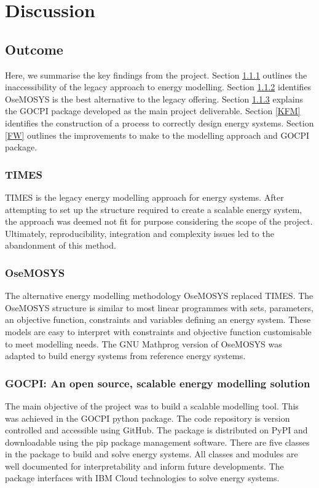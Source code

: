 \documentclass[12pt]{article}
\begin{document}
\section{Discussion}
\subsection{Outcome}
Here, we summarise the key findings from the project. 
Section \ref{KFT} outlines the inaccessibility of the legacy approach to energy modelling.
Section \ref{KFO} identifies OseMOSYS is the best alternative to the legacy offering.
Section \ref{KFG} explains the GOCPI package developed as the main project deliverable.
Section \ref{KFM} identifies the construction of a process to correctly design energy systems.
Section \ref{FW} outlines the improvements to make to the modelling approach and GOCPI package.
\subsubsection{TIMES} \label{KFT}
TIMES is the legacy energy modelling approach for energy systems. 
After attempting to set up the structure required to create a scalable energy system, the approach was deemed not fit for purpose considering the scope of the project.
Ultimately, reproducibility, integration and complexity issues led to the abandonment of this method.
\subsubsection{OseMOSYS}\label{KFO}
The alternative energy modelling methodology OseMOSYS replaced TIMES.
The OseMOSYS structure is similar to most linear programmes with sets, parameters, an objective function, constraints and variables defining an energy system.
These models are easy to interpret with constraints and objective function customisable to meet modelling needs.
The GNU Mathprog version of OseMOSYS was adapted to build energy systems from reference energy systems.
\subsubsection{GOCPI: An open source, scalable energy modelling solution}\label{KFG}
The main objective of the project was to build a scalable modelling tool.
This was achieved in the GOCPI python package. The code repository is version controlled and accessible using GitHub.
The package is distributed on PyPI and downloadable using the pip package management software.
There are five classes in the package to build and solve energy systems.
All classes and modules are well documented for interpretability and inform future developments.
The package interfaces with IBM Cloud technologies to solve energy systems.
\end{document}
